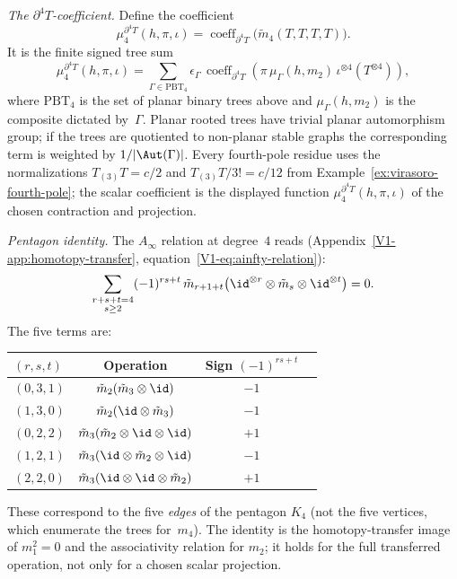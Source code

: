 \begin{computation}
\emph{The \(\partial^4T\)-coefficient.}
Define the coefficient
\begin{equation}\label{eq:m4-leading}
\mu_4^{\partial^4T}(h,\pi,\iota)
=\operatorname{coeff}_{\partial^4T}
\bigl(\widetilde m_4(T,T,T,T)\bigr).
\end{equation}
It is the finite signed tree sum
\[
\mu_4^{\partial^4T}(h,\pi,\iota)
=\sum_{\Gamma\in\mathrm{PBT}_4}
\epsilon_\Gamma\,
\operatorname{coeff}_{\partial^4T}
\left(\pi\,\mu_\Gamma(h,m_2)\,\iota^{\otimes 4}(T^{\otimes4})\right),
\]
where \(\mathrm{PBT}_4\) is the set of planar binary trees above and
\(\mu_\Gamma(h,m_2)\) is the composite dictated by~\(\Gamma\).  Planar
rooted trees have trivial planar automorphism group; if the trees are
quotiented to non-planar stable graphs the corresponding term is
weighted by \(1/|\Aut(\Gamma)|\).  Every fourth-pole residue uses the
normalizations \(T_{(3)}T=c/2\) and \(T_{(3)}T/3!=c/12\) from
Example~\ref{ex:virasoro-fourth-pole}; the scalar coefficient is the
displayed function \(\mu_4^{\partial^4T}(h,\pi,\iota)\) of the chosen
contraction and projection.

\emph{Pentagon identity.}
The $A_\infty$ relation at degree~$4$ reads
(Appendix~\ref{V1-app:homotopy-transfer},
equation~\eqref{V1-eq:ainfty-relation}):
\begin{equation}\label{eq:pentagon-ainfty}
\sum_{\substack{r+s+t = 4 \\ s \geq 2}} (-1)^{rs+t}\,
\tilde{m}_{r+1+t}\bigl(\id^{\otimes r} \otimes \tilde{m}_s
\otimes \id^{\otimes t}\bigr) = 0.
\end{equation}
The five terms are:
\begin{center}
\renewcommand{\arraystretch}{1.2}
\begin{tabular}{lccc}
\toprule
$(r,s,t)$ & Operation & Sign $(-1)^{rs+t}$ \\
\midrule
$(0,3,1)$ & $\tilde{m}_2(\tilde{m}_3 \otimes \id)$ & $-1$ \\
$(1,3,0)$ & $\tilde{m}_2(\id \otimes \tilde{m}_3)$ & $-1$ \\
$(0,2,2)$ & $\tilde{m}_3(\tilde{m}_2 \otimes \id \otimes \id)$ & $+1$ \\
$(1,2,1)$ & $\tilde{m}_3(\id \otimes \tilde{m}_2 \otimes \id)$ & $-1$ \\
$(2,2,0)$ & $\tilde{m}_3(\id \otimes \id \otimes \tilde{m}_2)$ & $+1$ \\
\bottomrule
\end{tabular}
\end{center}

These correspond to the five \emph{edges} of the pentagon $K_4$
(not the five vertices, which enumerate the trees for~$m_4$).
The identity is the homotopy-transfer image of \(m_1^2=0\) and the
associativity relation for \(m_2\); it holds for the full transferred
operation, not only for a chosen scalar projection.
\end{computation}

